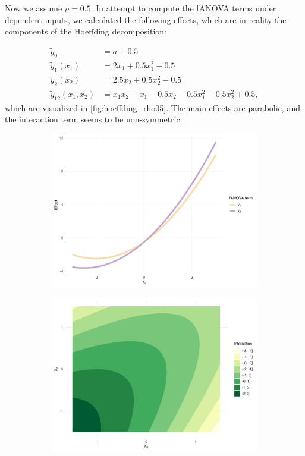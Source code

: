 Now we assume $\rho = 0.5$. In attempt to compute the fANOVA terms under dependent inputs, we calculated the following effects, which are in reality the components of the Hoeffding decomposition:

\begin{align*}
\tilde{y}_0 &= a + 0.5 \\[3pt]
\tilde{y}_1(x_1) &= 2x_1 + 0.5x_1^2 - 0.5 \\[3pt]
\tilde{y}_2(x_2) &= 2.5x_2 + 0.5x_2^2 - 0.5 \\[3pt]
\tilde{y}_{12}(x_1,x_2) &= x_1x_2 - x_1 - 0.5x_2 - 0.5x_1^2 - 0.5x_2^2 + 0.5,
\end{align*}
which are visualized in \autoref{fig:hoeffding_rho05}. The main effects are parabolic, and the interaction term seems to be non-symmetric.
\begin{figure}[htpb]
    \centering
    \begin{subfigure}[t]{0.49\textwidth}
        \centering
        \includegraphics[width=\textwidth]{images/experiment_section/hoeffding_rho05_main.png}
    \end{subfigure}%
    \hfill
    \begin{subfigure}[t]{0.49\textwidth}
        \centering
        \includegraphics[width=\textwidth]{images/experiment_section/hoeffding_rho05_interaction.png}

\end{subfigure}
\end{figure}
